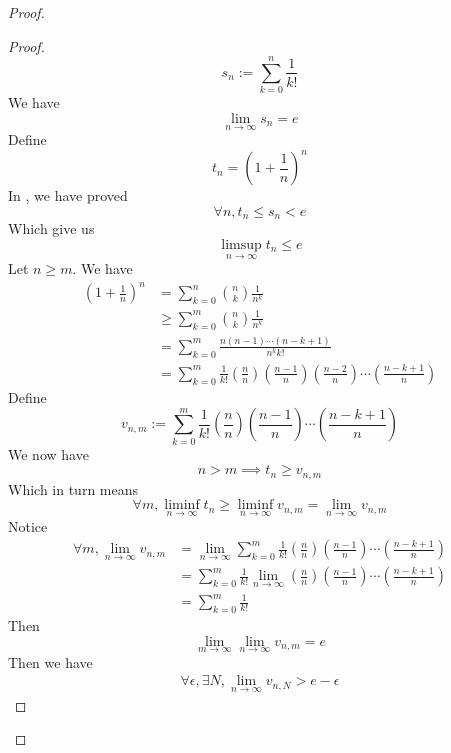 \documentclass{report}
\begin{document}
\begin{proof}
\begin{proof}
\begin{equation}
s_n:=\sum_{k=0}^n \frac{1}{k!}
\end{equation}
We have
\begin{equation}
\lim_{n\to\infty}s_n=e
\end{equation}
Define 
\begin{equation}
t_n=(1+\frac{1}{n})^n
\end{equation}
In , we have proved
\begin{equation}
\forall n, t_n\leq s_n<e
\end{equation}
Which give us
\begin{equation}
\limsup_{n\to\infty} t_n\leq e
\end{equation}
Let $n\geq m$. We have
\begin{align}
  (1+\frac{1}{n})^n&= \sum_{k=0}^n \binom{n}{k}\frac{1}{n^k}\\
  &\geq \sum_{k=0}^m \binom{n}{k}\frac{1}{n^k}\\
  &=\sum_{k=0}^m \frac{n(n-1)\cdots (n-k+1)}{n^k k!}\\
  &=\sum_{k=0}^m \frac{1}{k!}(\frac{n}{n})(\frac{n-1}{n})(\frac{n-2}{n})\cdots (\frac{n-k+1}{n})
\end{align}
Define 
\begin{equation}
v_{n,m}:=\sum_{k=0}^m \frac{1}{k!}(\frac{n}{n})(\frac{n-1}{n})\cdots (\frac{n-k+1}{n})
\end{equation}
We now have
\begin{equation}
  n>m\implies t_n\geq v_{n,m}
\end{equation}
Which in turn means
\begin{equation}
\forall m, \liminf_{n\to\infty} t_n\geq \liminf_{n\to\infty} v_{n,m}=\lim_{n\to\infty} v_{n,m}
\end{equation}
Notice 
\begin{align}
\forall m,\lim_{n\to\infty} v_{n,m}&=\lim_{n\to\infty}\sum_{k=0}^m \frac{1}{k!}(\frac{n}{n})(\frac{n-1}{n})\cdots (\frac{n-k+1}{n})\\
&=\sum_{k=0}^m \frac{1}{k!}\lim_{n\to\infty}(\frac{n}{n})(\frac{n-1}{n})\cdots (\frac{n-k+1}{n})\\
&=\sum_{k=0}^m \frac{1}{k!}
\end{align}
Then
\begin{equation}
\lim_{m\to\infty}\lim_{n\to\infty}v_{n,m}=e
\end{equation}
Then we have
\begin{align}
  \forall \epsilon , \exists N, \lim_{n\to\infty}v_{n,N}>e-\epsilon 
\end{align}

\end{proof}
\end{proof}
\end{document}
